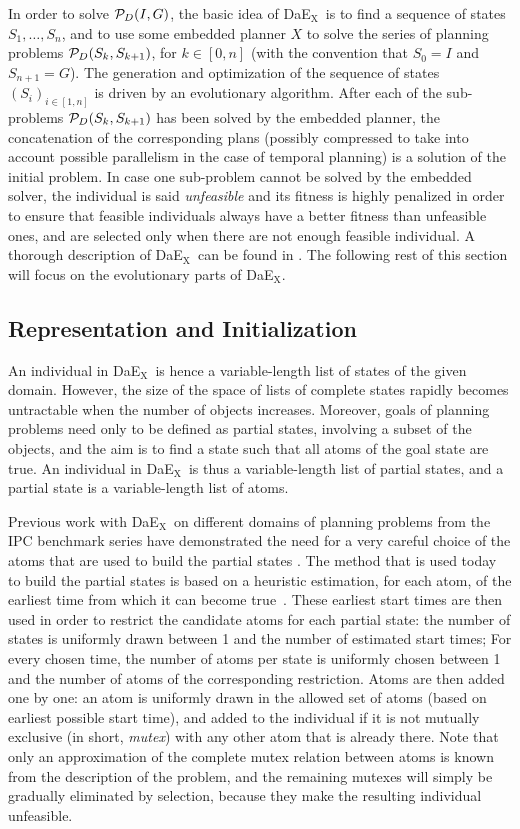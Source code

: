 \documentclass{llncs}
\def\DAEX{{\sc DaE$_{\text{X}}$}}
\begin{document}
In order to solve  ${\cal P}_D(I,G)$, the basic idea of \DAEX\ is to find a sequence of states $S_1, \ldots, S_n$, and to use some embedded planner $X$ to solve the series of planning problems ${\cal P}_D(S_{k},S_{k+1})$, for $k \in [0,n]$ (with the convention that $S_0 = I$ and $S_{n+1} = G$).
The generation and optimization of the sequence of states $(S_i)_{i \in [1,n]}$  is driven by an evolutionary algorithm. After each of the sub-problems ${\cal P}_D(S_{k},S_{k+1})$ has been solved by the embedded planner, the concatenation of the corresponding plans (possibly compressed to take into account possible parallelism in the case of temporal planning) is a solution of the initial problem. In case one sub-problem cannot be solved by the embedded solver, the individual is said {\em unfeasible} and its fitness is highly penalized in order to ensure that feasible individuals always have a better fitness than unfeasible ones, and are selected only when there are not enough feasible individual. A thorough description of \DAEX\ can be found in \cite{Bibai2010}. The following rest of this section will focus on the evolutionary parts of \DAEX.

\subsection{Representation and Initialization}
An individual in \DAEX\ is hence a  variable-length list of states of the given domain.
However, the size of the space of lists of complete states rapidly becomes untractable when the number of objects increases. Moreover, goals of planning problems need only to be defined as partial states, involving a subset of the objects, and the aim is to find a state such that all atoms of the goal state are true. An individual in \DAEX\ is thus a variable-length list of partial states, and a partial state is a variable-length list of atoms.

Previous work with \DAEX\ on different domains of planning problems from the
IPC benchmark series have demonstrated the need for a very careful choice of the atoms that are used to build the partial states \cite{bibai-EvoCOP2010}. 
The method that is used today to build the partial states is based on a heuristic estimation, for each atom, of the earliest time from which it can become true~\cite{Haslum2000}. %
These earliest start times are then used in order to restrict the candidate atoms for each partial state:
the number of states is uniformly drawn between 1 and the number of estimated start times; For every chosen time, the number of atoms per state is uniformly chosen between 1 and the number of atoms of the corresponding restriction.
Atoms are then added one by one: an atom is uniformly drawn in the allowed set of atoms (based on earliest possible start time), and added to the individual if it is not mutually exclusive (in short, {\em mutex}) with any other atom that is already there. Note that only an approximation of the complete mutex relation between atoms is known from the description of the problem, and the remaining mutexes will simply be gradually eliminated by selection, because they make the resulting individual unfeasible. 
\end{document}
